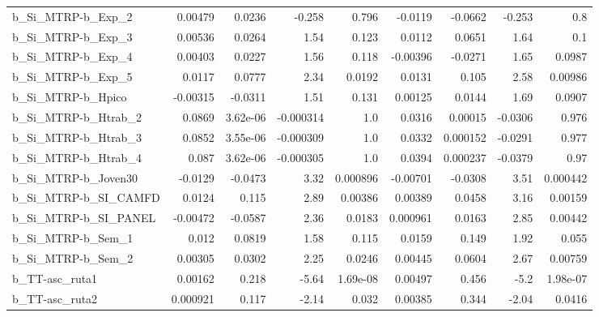 \begin{tabular}{lrrrrrrrr}
b\_Si\_MTRP-b\_Exp\_2          &     0.00479 &       0.0236 &    -0.258 &    0.796 &    -0.0119 &     -0.0662 &       -0.253 &           0.8 \\
b\_Si\_MTRP-b\_Exp\_3          &     0.00536 &       0.0264 &      1.54 &    0.123 &     0.0112 &      0.0651 &         1.64 &           0.1 \\
b\_Si\_MTRP-b\_Exp\_4          &     0.00403 &       0.0227 &      1.56 &    0.118 &   -0.00396 &     -0.0271 &         1.65 &        0.0987 \\
b\_Si\_MTRP-b\_Exp\_5          &      0.0117 &       0.0777 &      2.34 &   0.0192 &     0.0131 &       0.105 &         2.58 &       0.00986 \\
b\_Si\_MTRP-b\_Hpico          &    -0.00315 &      -0.0311 &      1.51 &    0.131 &    0.00125 &      0.0144 &         1.69 &        0.0907 \\
b\_Si\_MTRP-b\_Htrab\_2        &      0.0869 &     3.62e-06 & -0.000314 &      1.0 &     0.0316 &     0.00015 &      -0.0306 &         0.976 \\
b\_Si\_MTRP-b\_Htrab\_3        &      0.0852 &     3.55e-06 & -0.000309 &      1.0 &     0.0332 &    0.000152 &      -0.0291 &         0.977 \\
b\_Si\_MTRP-b\_Htrab\_4        &       0.087 &     3.62e-06 & -0.000305 &      1.0 &     0.0394 &    0.000237 &      -0.0379 &          0.97 \\
b\_Si\_MTRP-b\_Joven30        &     -0.0129 &      -0.0473 &      3.32 & 0.000896 &   -0.00701 &     -0.0308 &         3.51 &      0.000442 \\
b\_Si\_MTRP-b\_SI\_CAMFD       &      0.0124 &        0.115 &      2.89 &  0.00386 &    0.00389 &      0.0458 &         3.16 &       0.00159 \\
b\_Si\_MTRP-b\_SI\_PANEL       &    -0.00472 &      -0.0587 &      2.36 &   0.0183 &   0.000961 &      0.0163 &         2.85 &       0.00442 \\
b\_Si\_MTRP-b\_Sem\_1          &       0.012 &       0.0819 &      1.58 &    0.115 &     0.0159 &       0.149 &         1.92 &         0.055 \\
b\_Si\_MTRP-b\_Sem\_2          &     0.00305 &       0.0302 &      2.25 &   0.0246 &    0.00445 &      0.0604 &         2.67 &       0.00759 \\
b\_TT-asc\_ruta1             &     0.00162 &        0.218 &     -5.64 & 1.69e-08 &    0.00497 &       0.456 &         -5.2 &      1.98e-07 \\
b\_TT-asc\_ruta2             &    0.000921 &        0.117 &     -2.14 &    0.032 &    0.00385 &       0.344 &        -2.04 &        0.0416 \\

\end{tabular}
